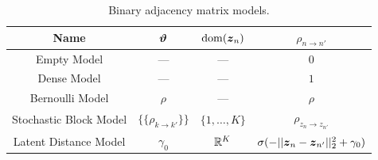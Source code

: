\begin{table}
\begin{center}
\begin{tabular}{c|c|c|c}
Name & $\boldsymbol{\vartheta}$ & $\mathrm{dom}(\boldsymbol{z}_n)$ & $\rho_{n \to n'}$ \\
\hline
Empty Model & --- &  --- & $0$ \\
Dense Model & --- & --- & $1$ \\
Bernoulli Model & $\rho$ & --- & $\rho$ \\
Stochastic Block Model & $\{\{\rho_{k \to k'}\}\}$ & $\{1, \ldots, K\}$ & $\rho_{z_n \to z_{n'}}$ \\
Latent Distance Model & $\gamma_0$ & $\mathbb{R}^K$ & $\sigma(-||\boldsymbol{z}_n - \boldsymbol{z}_{n'}||_2^2 + \gamma_0)$
\end{tabular}
\end{center}
\caption{Binary adjacency matrix models.}
\label{tab:A_models}
\end{table}

